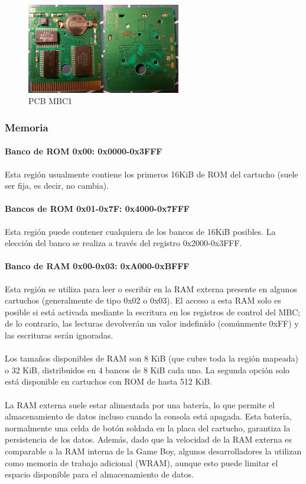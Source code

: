 \begin{figure}[H]
    \centering
    \includegraphics[width=0.6\textwidth]{include/images/mbc1.jpg}
    \caption{PCB MBC1}
    \label{figure:cart_mbc1}
\end{figure}

\subsubsection{Memoria}

\paragraph{Banco de ROM 0x00: 0x0000-0x3FFF}
\label{par:rom0bank}
Esta región usualmente contiene los primeros 16KiB de ROM del cartucho (suele ser fija, es decir, no cambia).

\paragraph{Bancos de ROM 0x01-0x7F: 0x4000-0x7FFF}
Esta región puede contener cualquiera de los bancos de 16KiB posibles. La elección del banco se realiza a través del registro 0x2000-0x3FFF.

\paragraph{Banco de RAM 0x00-0x03: 0xA000-0xBFFF}
Esta región se utiliza para leer o escribir en la RAM externa presente en algunos cartuchos (generalmente de tipo 0x02 o 0x03). El acceso a esta RAM solo es posible si está activada mediante la escritura en los registros de control del MBC; de lo contrario, las lecturas devolverán un valor indefinido (comúnmente 0xFF) y las escrituras serán ignoradas.
\\\\
Los tamaños disponibles de RAM son 8 KiB (que cubre toda la región mapeada) o 32 KiB, distribuidos en 4 bancos de 8 KiB cada uno. La segunda opción solo está disponible en cartuchos con ROM de hasta 512 KiB.
\\\\
La RAM externa suele estar alimentada por una batería, lo que permite el almacenamiento de datos incluso cuando la consola está apagada. Esta batería, normalmente una celda de botón soldada en la placa del cartucho, garantiza la persistencia de los datos. Además, dado que la velocidad de la RAM externa es comparable a la RAM interna de la Game Boy, algunos desarrolladores la utilizan como memoria de trabajo adicional (WRAM), aunque esto puede limitar el espacio disponible para el almacenamiento de datos.

